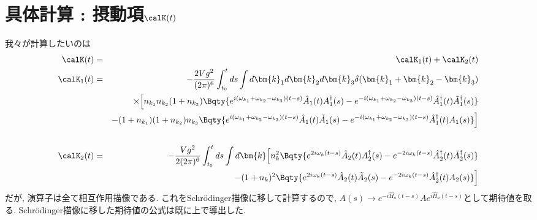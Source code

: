 \documentclass[10.5pt,a4paper]{jreport}
\begin{document}
\section{具体計算 : 摂動項$\calK(t)$}
我々が計算したいのは
\begin{eqnarray}
  \calK(t) &=& \calK_1(t) + \calK_2(t)\\
  \nonumber  \calK_1(t)&=& -\frac{2Vg^2}{(2\pi)^6}\int_{t_0}^tds\int d\bm{k}_1d\bm{k}_2d\bm{k}_3\delta(\bm{k}_1+\bm{k}_2-\bm{k}_3)\\
  \nonumber  &&\times\Bigl[n_{k_1}n_{k_2}(1+n_{k_3})\Bqty{ e^{i(\omega_{k_1}+\omega_{k_2}  - \omega_{k_3})(t-s)}\hat{A}_1(t)A_1^\dagger(s) - e^{-i(\omega_{k_1}+\omega_{k_2}  - \omega_{k_3})(t-s)}\hat{A}^\dagger_1(t)\tilde{A}_1^\dagger(s) }\\
    \nonumber  &&-(1+n_{k_1})(1+n_{k_2})n_{k_3}\Bqty{e^{i(\omega_{k_1}+\omega_{k_2}  - \omega_{k_3})(t-s)}\hat{A}_1(t)\tilde{A}_1(s) - e^{-i(\omega_{k_1}+\omega_{k_2}  - \omega_{k_3})(t-s)}\hat{A}^\dagger_1(t)A_1(s) }\Bigr]\\
  \\
  \nonumber  \calK_2(t) &=& -\frac{Vg^2}{2(2\pi)^6}\int_{t_0}^tds\int d\bm{k}\Bigl[ n_k^2\Bqty{e^{2i\omega_{k}(t-s)}\hat{A}_2(t)A_2^\dagger(s) - e^{-2i\omega_{k}(t-s)}\hat{A}^\dagger_2(t)\tilde{A}_2^\dagger(s)}\\
    &&-(1+n_{k})^2\Bqty{e^{2i\omega_{k}(t-s)}\hat{A}_2(t)\tilde{A}_2(s) - e^{-2i\omega_{k}(t-s)}\hat{A}^\dagger_2(t)A_2(s)}\Bigr]
\end{eqnarray}
だが, 演算子は全て相互作用描像である. これをSchr\"odinger描像に移して計算するので, $A(s)\rightarrow e^{-i\hat{H}_a(t-s)}Ae^{i\hat{H}_a(t-s)}$として期待値を取る. Schr\"odinger描像に移した期待値の公式は既に上で導出した.
\end{document}
